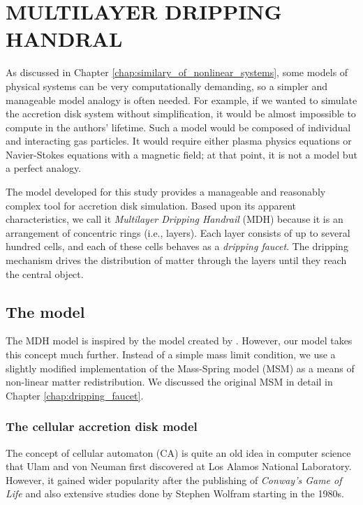 \chapter{MULTILAYER DRIPPING HANDRAL}
    \label{chap:multilayer_dripping_handrail}
    \thispagestyle{empty}


As discussed in Chapter \ref{chap:similary_of_nonlinear_systems}, some models of physical systems can be very computationally demanding, so a simpler and manageable model analogy is often needed. For example, if we wanted to simulate the accretion disk system without simplification, it would be almost impossible to compute in the authors' lifetime. Such a model would be composed of individual and interacting gas particles. It would require either plasma physics equations or Navier-Stokes equations with a magnetic field; at that point, it is not a model but a perfect analogy. 

The model developed for this study provides a manageable and reasonably complex tool for accretion disk simulation. Based upon its apparent characteristics, we call it \emph{Multilayer Dripping Handrail} (MDH) because it is an arrangement of concentric rings (i.e., layers). Each layer consists of up to several hundred cells, and each of these cells behaves as a \emph{dripping faucet}. The dripping mechanism drives the distribution of matter through the layers until they reach the central object.

\section{The model}

The MDH model is inspired by the model created by \cite{yonehara1997}. However, our model takes this concept much further. Instead of a simple mass limit condition, we use a slightly modified implementation of the Mass-Spring model (MSM) as a means of non-linear matter redistribution. We discussed the original MSM in detail in Chapter \ref{chap:dripping_faucet}. 

\subsection{The cellular accretion disk model}

The concept of cellular automaton (CA) is quite an old idea in computer science that Ulam and von Neuman first discovered at Los Alamos National Laboratory. However, it gained wider popularity after the publishing of \emph{Conway's Game of Life} \cite{gardner1970} and also extensive studies done by Stephen Wolfram starting in the 1980s.

